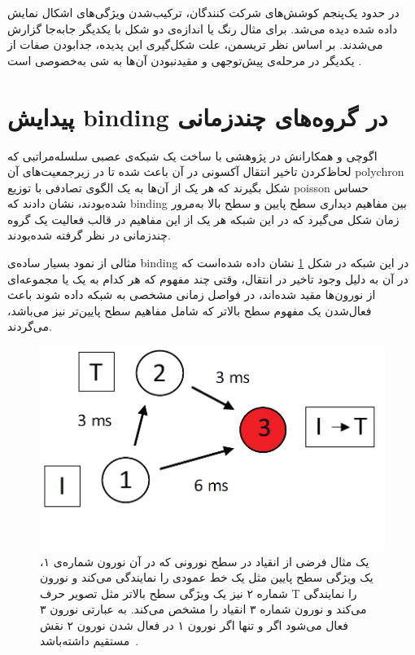 \documentclass[12pt]{report}
\begin{document}
	در حدود یک‌پنجم کوشش‌های شرکت کنندگان، ترکیب‌شدن ویژگی‌های اشکال نمایش داده شده دیده می‌شد. برای مثال رنگ یا اندازه‌ی دو شکل با یکدیگر جابه‌جا گزارش می‌شدند.
	بر اساس نظر تریسمن، علت شکل‌گیری این پدیده، جدا‌بودن صفات از یکدیگر در مرحله‌ی پیش‌توجهی و مقید‌نبودن آن‌ها به شی‌ به‌خصوصی است \cite{goldstein_2019}.
	
	\section{پیدایش \gls{binding} در گروه‌های چندزمانی}
	اگوچی و همکارانش در پژوهشی
	\cite{EGUCHI2018a}
	با ساخت یک شبکه‌ی عصبی سلسله‌مراتبی که لحاظ‌کردن تاخیر انتقال آکسونی در آن باعث شده تا در زیرجمعیت‌های آن \gls{polychron}\cite{Izhikevich2006-dy} شکل بگیرند که هر یک از آن‌ها به یک الگوی تصادفی با توزیع \gls{poisson} حساس شده‌بودند، نشان دادند که \gls{binding} بین مفاهیم دیداری سطح پایین و سطح بالا به‌مرور زمان شکل می‌گیرد که در این شبکه هر یک از این مفاهیم در قالب فعالیت یک گروه چندزمانی در نظر گرفته‌ شده‌بودند.
	
	مثالی از نمود بسیار ساده‌ی \gls{binding} در این شبکه در شکل \ref{fig:eguchi-binding} نشان داده شده‌است که در آن به دلیل وجود تاخیر در انتقال، وقتی چند مفهوم که هر کدام به یک یا مجموعه‌ای از نورون‌ها مقید‌ شده‌اند، در فواصل زمانی مشخصی به شبکه داده شوند باعث فعال‌شدن یک مفهوم سطح بالاتر که شامل مفاهیم سطح پایین‌تر نیز می‌باشد، می‌گردند.
	
	\begin{figure}[H]
		\centering
		\includegraphics[width=0.6\linewidth]{poly-bind.png}
		\caption[NS]{
			یک مثال فرضی از انقیاد در سطح نورونی که در آن نورون شماره‌ی ۱، یک ویژگی سطح پایین مثل یک خط عمودی را نمایندگی می‌کند و نورون شماره ۲ نیز یک ویژگی سطح بالاتر مثل تصویر حرف T را نمایندگی می‌کند و نورون شماره ۳ انقیاد را مشخص می‌کند. به عبارتی نورون ۳ فعال می‌شود اگر و تنها اگر نورون ۱ در فعال شدن نورون ۲ نقش مستقیم داشته‌باشد~\cite{EGUCHI2018a}.
		}
		\label{fig:eguchi-binding}
	\end{figure}
	
\end{document}
